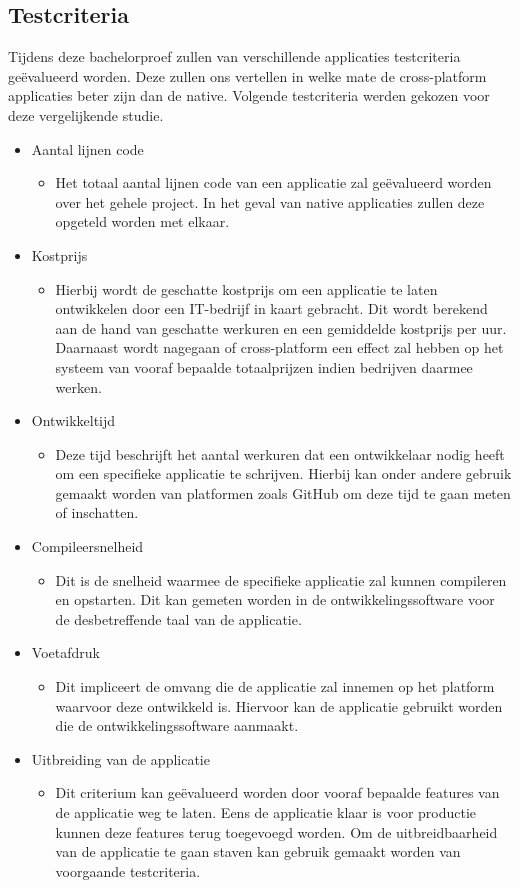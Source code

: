 \subsection{Testcriteria}
\label{sec:testcriteria}
Tijdens deze bachelorproef zullen van verschillende applicaties testcriteria geëvalueerd worden. Deze zullen ons vertellen in welke mate de cross-platform applicaties beter zijn dan de native. Volgende testcriteria werden gekozen voor deze vergelijkende studie.
\begin{itemize}
\item Aantal lijnen code
\begin{itemize}
 \item Het totaal aantal lijnen code van een applicatie zal geëvalueerd worden over het gehele project. In het geval van native applicaties zullen deze opgeteld worden met elkaar.
\end{itemize}
 \item Kostprijs
 \begin{itemize}
\item Hierbij wordt de geschatte kostprijs om een applicatie te laten ontwikkelen door een IT-bedrijf in kaart gebracht. Dit wordt berekend aan de hand van geschatte werkuren en een gemiddelde kostprijs per uur. Daarnaast wordt nagegaan of cross-platform een effect zal hebben op het systeem van vooraf bepaalde totaalprijzen indien bedrijven daarmee werken.
\end{itemize}
\item Ontwikkeltijd
\begin{itemize}
\item Deze tijd beschrijft het aantal werkuren dat een ontwikkelaar nodig heeft om een specifieke applicatie te schrijven. Hierbij kan onder andere gebruik gemaakt worden van platformen zoals GitHub om deze tijd te gaan meten of inschatten.
\end{itemize}
\item Compileersnelheid
\begin{itemize}
\item Dit is de snelheid waarmee de specifieke applicatie zal kunnen compileren en opstarten. Dit kan gemeten worden in de ontwikkelingssoftware voor de desbetreffende taal van de applicatie.
\end{itemize}
\item Voetafdruk
\begin{itemize}
\item Dit impliceert de omvang die de applicatie zal innemen op het platform waarvoor deze ontwikkeld is. Hiervoor kan de applicatie gebruikt worden die de ontwikkelingssoftware aanmaakt.
\end{itemize}
\item Uitbreiding van de applicatie
\begin{itemize}
\item Dit criterium kan geëvalueerd worden door vooraf bepaalde features van de applicatie weg te laten. Eens de applicatie klaar is voor productie kunnen deze features terug toegevoegd worden. Om de uitbreidbaarheid van de applicatie te gaan staven kan gebruik gemaakt worden van voorgaande testcriteria.
\end{itemize}
\end{itemize}

